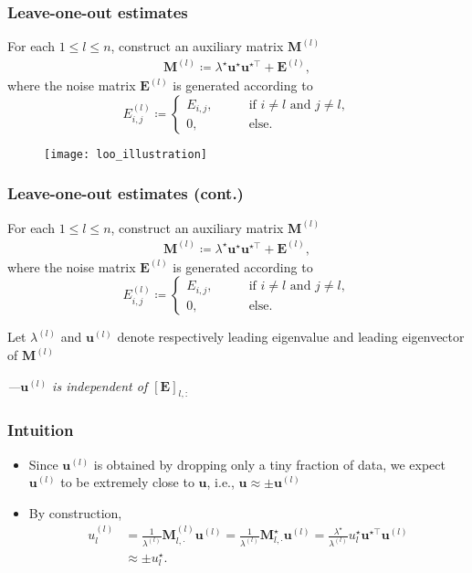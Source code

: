 \documentclass[compress,
mathserif,wide,%
]{beamer}
\begin{document}
\begin{frame}
	\frametitle{Leave-one-out estimates}
	For each $1\leq l\leq n$, construct an auxiliary matrix  $\bm{M}^{(l)}$ 
\begin{align*}
	\bm{M}^{(l)} \coloneqq \lambda^{\star}\bm{u}^{\star}\bm{u}^{\star\top}+\bm{E}^{(l)} , 
\end{align*}
%
where the noise matrix $\bm{E}^{(l)}$ is generated according to
%
\begin{equation*}
E_{i,j}^{(l)} \coloneqq
\begin{cases}
E_{i,j},\qquad & \text{if }i\neq l\text{ and }j\neq l, \\
0, & \text{else}.
\end{cases}
\end{equation*}

\vspace{-1em}
	\begin{figure}[t]
\begin{center}
\texttt{[image: loo\_illustration]}
\end{center}
\end{figure}
\end{frame}

\begin{frame}
\frametitle{Leave-one-out estimates (cont.)}
	For each $1\leq l\leq n$, construct an auxiliary matrix  $\bm{M}^{(l)}$ 
\begin{align*}
	\bm{M}^{(l)} \coloneqq \lambda^{\star}\bm{u}^{\star}\bm{u}^{\star\top}+\bm{E}^{(l)} , 
\end{align*}
%
where the noise matrix $\bm{E}^{(l)}$ is generated according to
%
\begin{equation*}
E_{i,j}^{(l)} \coloneqq
\begin{cases}
E_{i,j},\qquad & \text{if }i\neq l\text{ and }j\neq l, \\
0, & \text{else}.
\end{cases}
\end{equation*}

Let $\lambda^{(l)}$ and $\bm{u}^{(l)}$ denote respectively leading eigenvalue and leading eigenvector of $\bm{M}^{(l)}$

{\hfill \em ---$\bm{u}^{(l)}$ is independent of $[ \bm {E} ]_{l, :}$}
\end{frame}

\begin{frame}
	\frametitle{Intuition}
	\begin{itemize}
		\item Since $\bm{u}^{(l)}$ is obtained by dropping only a tiny fraction of data, we expect $\bm{u}^{(l)}$ to be extremely close to $\bm{u}$, i.e., $\bm{u} \approx \pm \bm{u}^{(l)}$
		\item By construction, 
		\begin{align*}
		u_{l}^{(l)} & =\frac{1}{\lambda^{(l)}}\bm{M}_{l,\cdot}^{(l)}\bm{u}^{(l)}=\frac{1}{\lambda^{(l)}}\bm{M}_{l,\cdot}^{\star}\bm{u}^{(l)}=\frac{\lambda^{\star}}{\lambda^{(l)}}u_{l}^{\star}\bm{u}^{\star\top}\bm{u}^{(l)}   \\
		& \approx \pm u_{l}^{\star}.
	\end{align*}
	\end{itemize}
\end{frame}
\end{document}
